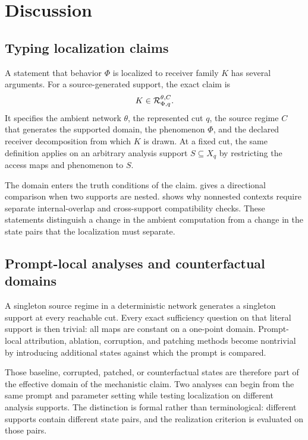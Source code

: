 \section{Discussion}
\label{sec:discussion}

\subsection{Typing localization claims}

A statement that behavior $\Phi$ is localized to receiver family $K$ has several arguments. For a source-generated support, the exact claim is
\[
K\in\mathcal{R}_{\Phi,q}^{\theta,C}.
\]
It specifies the ambient network $\theta$, the represented cut $q$, the source regime $C$ that generates the supported domain, the phenomenon $\Phi$, and the declared receiver decomposition from which $K$ is drawn. At a fixed cut, the same definition applies on an arbitrary analysis support $S\subseteq X_q$ by restricting the access maps and phenomenon to $S$.

The domain enters the truth conditions of the claim.  gives a directional comparison when two supports are nested.  shows why nonnested contexts require separate internal-overlap and cross-support compatibility checks. These statements distinguish a change in the ambient computation from a change in the state pairs that the localization must separate.

\subsection{Prompt-local analyses and counterfactual domains}

A singleton source regime in a deterministic network generates a singleton support at every reachable cut. Every exact sufficiency question on that literal support is then trivial: all maps are constant on a one-point domain. Prompt-local attribution, ablation, corruption, and patching methods become nontrivial by introducing additional states against which the prompt is compared.

Those baseline, corrupted, patched, or counterfactual states are therefore part of the effective domain of the mechanistic claim. Two analyses can begin from the same prompt and parameter setting while testing localization on different analysis supports. The distinction is formal rather than terminological: different supports contain different state pairs, and the realization criterion is evaluated on those pairs.

